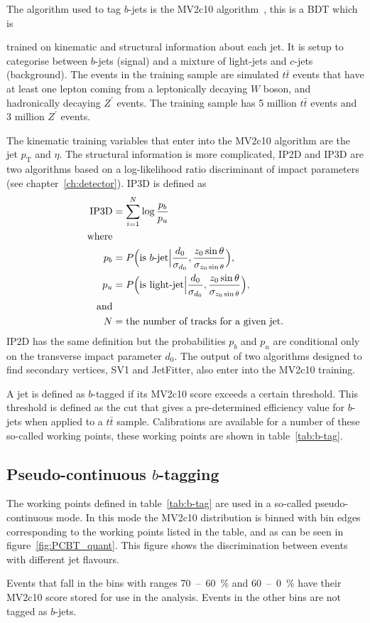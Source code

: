 The algorithm used to tag $b$-jets is the MV2c10 algorithm~\cite{mv2c10}, this
is a BDT which is

trained on kinematic and structural information about each jet. It is setup to
categorise between $b$-jets (signal) and a mixture of light-jets and $c$-jets
(background). The events in the training sample are simulated $t\bar{t}$ events
that have at least one lepton coming from a leptonically decaying $W$ boson, and
hadronically decaying $Z^\prime$ events. The training sample has 5 million
$t\bar{t}$ events and 3 million $Z^\prime$ events.

The kinematic training variables that enter into the MV2c10 algorithm are
the jet $p_{\mathrm{T}}$ and $\eta$. The structural information is more complicated, IP2D
and IP3D are two algorithms based on a log-likelihood ratio discriminant of
impact parameters (see chapter~\ref{ch:detector}). IP3D is defined as
\begin{align}
  \text{IP3D} &=\sum_{i=1}^{N}\log{\frac{p_b}{p_u}} \\
  \text{where}& \notag \\
  p_b &= P\Big(\text{is }b\text{-jet} \Big\vert \frac{d_0}{\sigma_{d_0}},
        \frac{z_0 \sin{\theta}}{\sigma_{z_0\sin{\theta}}}\Big),\\
  p_u &= P\Big(\text{is light-jet} \Big\vert \frac{d_0}{\sigma_{d_0}},
        \frac{z_0 \sin{\theta}}{\sigma_{z_0\sin{\theta}}}\Big),\\
  \text{and} & \notag \\
  N &= \text{the number of tracks for a given jet.} \notag
\end{align}
IP2D has the same definition but the probabilities $p_b$ and $p_u$ are
conditional only on the transverse impact parameter $d_0$. The output of two
algorithms designed to find secondary vertices, SV1 and JetFitter, also enter
into the MV2c10 training.

A jet is defined as $b$-tagged if its MV2c10 score exceeds a certain threshold. This
threshold is defined as the cut that gives a pre-determined efficiency value for
$b$-jets when applied to a $t\bar{t}$ sample. Calibrations are available for a
number of these so-called working points, these working points are shown in
table~\ref{tab:b-tag}.


\subsection{Pseudo-continuous $b$-tagging}
The working points defined in table~\ref{tab:b-tag} are used in a so-called
pseudo-continuous mode. In this mode the MV2c10 distribution is binned with bin
edges corresponding to the working points listed in the table, and as can be
seen in figure~\ref{fig:PCBT_quant}. This figure shows the discrimination between
events with different jet flavours. 

Events that fall in the bins with ranges 70~--~60~\% and 60~--~0~\% have their
MV2c10 score stored for use in the analysis. Events in the other bins are not
tagged as $b$-jets.

